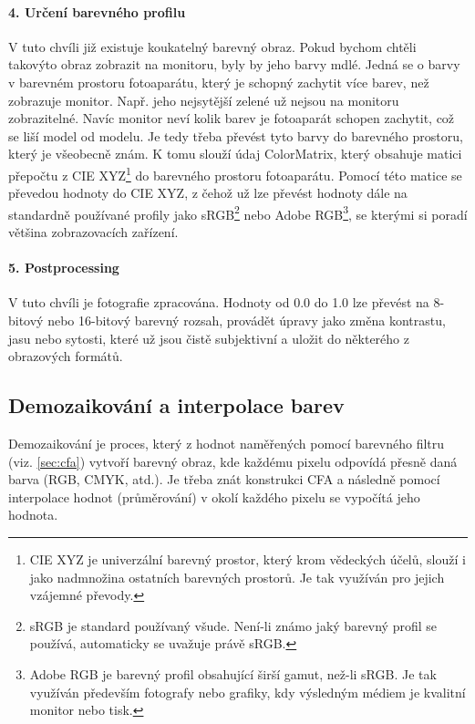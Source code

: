 \documentclass[12pt,a4paper,titlepage,final]{report}
\begin{document}
\paragraph{4. Určení barevného profilu} V tuto chvíli již existuje koukatelný barevný obraz. Pokud bychom chtěli takovýto obraz zobrazit na monitoru, byly by jeho barvy mdlé. Jedná se o barvy v barevném prostoru fotoaparátu, který je schopný zachytit více barev, než zobrazuje monitor. Např. jeho nejsytější zelené už nejsou na monitoru zobrazitelné. Navíc monitor neví kolik barev je fotoaparát schopen zachytit, což se liší model od modelu. Je tedy třeba převést tyto barvy do barevného prostoru, který je všeobecně znám. K tomu slouží údaj ColorMatrix, který obsahuje matici přepočtu z CIE XYZ\footnote{CIE XYZ je univerzální barevný prostor, který krom vědeckých účelů, slouží i jako nadmnožina ostatních barevných prostorů. Je tak využíván pro jejich vzájemné převody.} do barevného prostoru fotoaparátu. Pomocí této matice se převedou hodnoty do CIE XYZ, z čehož už lze převést hodnoty dále na standardně používané profily jako sRGB\footnote{sRGB je standard používaný všude. Není-li známo jaký barevný profil se používá, automaticky se uvažuje právě sRGB.} nebo Adobe RGB\footnote{Adobe RGB je barevný profil obsahující širší gamut, než-li sRGB. Je tak využíván především fotografy nebo grafiky, kdy výsledným médiem je kvalitní monitor nebo tisk.}, se kterými si poradí většina zobrazovacích zařízení.

\paragraph{5. Postprocessing}

V tuto chvíli je fotografie zpracována. Hodnoty od 0.0 do 1.0 lze převést na 8-bitový nebo 16-bitový barevný rozsah, provádět úpravy jako změna kontrastu, jasu nebo sytosti, které už jsou čistě subjektivní a uložit do některého z obrazových formátů.

\subsection{Demozaikování a interpolace barev} \label{subsec:demozaikovani}

Demozaikování je proces, který z hodnot naměřených pomocí barevného filtru (viz. \ref{sec:cfa}) vytvoří barevný obraz, kde každému pixelu odpovídá přesně daná barva (RGB, CMYK, atd.). Je třeba znát konstrukci CFA a následně pomocí interpolace hodnot (průměrování) v okolí každého pixelu se vypočítá jeho hodnota.
\end{document}
